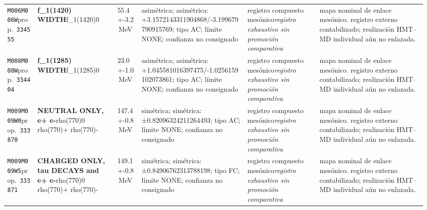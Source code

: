 \begin{landscape}
\begin{longtable}{L{1.85cm}L{4.45cm}L{2.35cm}L{4.05cm}L{3.35cm}L{7.15cm}}
\texttt{M006}\newline \texttt{M006W}\newline prop.\ \texttt{334555} & \textbf{f\_\allowbreak{}1(1420) WIDTH}\newline f\_\allowbreak{}1(1420)0 & 55.4+-3.2\,MeV & asimétrica; asimétrica: +3.1572143311904868/-3.199679790915769; tipo AC; límite NONE; confianza no consignado & registro compuesto mesónico\newline \emph{registro exhaustivo sin promoción comparativa} & mapa nominal de enlace mesónico. registro externo contabilizado; realización HMT--MD individual aún no enlazada. \\
\texttt{M008}\newline \texttt{M008W}\newline prop.\ \texttt{334404} & \textbf{f\_\allowbreak{}1(1285) WIDTH}\newline f\_\allowbreak{}1(1285)0 & 23.0+-1.0\,MeV & asimétrica; asimétrica: +1.045581016397475/-1.0256159102073861; tipo AC; límite NONE; confianza no consignado & registro compuesto mesónico\newline \emph{registro exhaustivo sin promoción comparativa} & mapa nominal de enlace mesónico. registro externo contabilizado; realización HMT--MD individual aún no enlazada. \\
\texttt{M009}\newline \texttt{M009W0}\newline prop.\ \texttt{333870} & \textbf{NEUTRAL ONLY, e+ e-}\newline rho(770)0 \textbar{}\allowbreak{} rho(770)+ \textbar{}\allowbreak{} rho(770)- & 147.4+-0.8\,MeV & simétrica; simétrica: ±0.82096324211264493; tipo AC; límite NONE; confianza no consignado & registro compuesto mesónico\newline \emph{registro exhaustivo sin promoción comparativa} & mapa nominal de enlace mesónico. registro externo contabilizado; realización HMT--MD individual aún no enlazada. \\
\texttt{M009}\newline \texttt{M009W5}\newline prop.\ \texttt{333871} & \textbf{CHARGED ONLY, tau DECAYS and e+ e-}\newline rho(770)0 \textbar{}\allowbreak{} rho(770)+ \textbar{}\allowbreak{} rho(770)- & 149.1+-0.8\,MeV & simétrica; simétrica: ±0.84906762313788198; tipo FC; límite NONE; confianza no consignado & registro compuesto mesónico\newline \emph{registro exhaustivo sin promoción comparativa} & mapa nominal de enlace mesónico. registro externo contabilizado; realización HMT--MD individual aún no enlazada. \\

\end{longtable}
\end{landscape}
